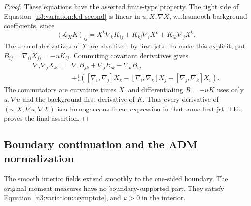 \begin{proof}
These equations have the asserted finite-type property.  The
right side of Equation~\eqref{n3:variation:kid-second} is linear in
$u,X,\nabla X$, with smooth background coefficients, since
\[
 (\mathcal L_XK)_{ij}
   =X^k\nabla_kK_{ij}
            +K_{kj}\nabla_iX^k+K_{ik}\nabla_jX^k.
\]
The second derivatives of $X$ are also fixed by first jets.  To
make this explicit, put $B_{ij}=\nabla_{(i}X_{j)}=-uK_{ij}$.
Commuting covariant derivatives gives
\begin{equation}
 \begin{split}
 \nabla_i\nabla_jX_k
   ={}&\nabla_i B_{jk}+\nabla_j B_{ik}-\nabla_k B_{ij}\\
     &+\tfrac12\left(
        [\nabla_i,\nabla_j]X_k
        -[\nabla_i,\nabla_k]X_j
        -[\nabla_j,\nabla_k]X_i\right).
 \end{split}
 \label{n3:variation:prolongation}
\end{equation}
The commutators are curvature times $X$, and differentiating $B=-uK$
uses only $u,\nabla u$ and the background first derivative of $K$.
Thus every derivative of $(u,X,\nabla u,\nabla X)$ is a homogeneous
linear expression in that same first jet.  This proves the final
assertion.
\end{proof}

\subsection{Boundary continuation and the ADM normalization}
\label{n3:variation:continuation-subsection}

\begin{lemma}
\label{n3:variation:regularity-normalization}
The smooth interior fields extend smoothly to the one-sided boundary.
The original moment measures have no boundary-supported part.  They
satisfy Equation~\eqref{n3:variation:asymptote}, and $u>0$ in the
interior.
\end{lemma}

